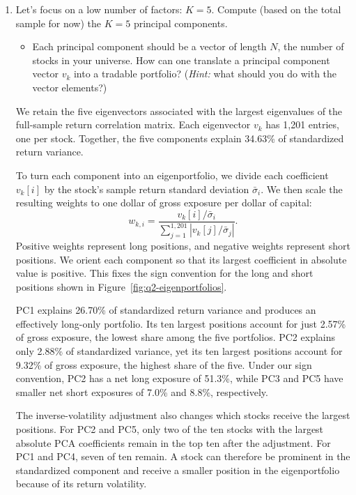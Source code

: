 \documentclass[12pt,letterpaper]{article}
\newcommand{\answer}{\par\medskip}
\begin{document}
\begin{enumerate}
\item Let's focus on a low number of factors: $K=5$. Compute (based on the total
sample for now) the $K=5$ principal components.

\begin{itemize}
\item Each principal component should be a vector of length $N$, the number
of stocks in your universe. How can one translate a principal component vector
$v_k$ into a tradable portfolio? (\emph{Hint:} what should you do with the
vector elements?)
\end{itemize}

\answer
We retain the five eigenvectors associated with the largest eigenvalues
of the full-sample return correlation matrix. Each eigenvector \(v_k\)
has 1,201 entries, one per stock. Together, the five components explain
34.63\% of standardized return variance.

To turn each component into an eigenportfolio, we divide each
coefficient \(v_k[i]\) by the stock's sample return standard deviation
\(\bar{\sigma}_i\). We then scale the resulting weights to one dollar
of gross exposure per dollar of capital:
\[
w_{k,i}
=
\frac{v_k[i]/\bar{\sigma}_i}
     {\displaystyle\sum_{j=1}^{1{,}201}
      \left|v_k[j]/\bar{\sigma}_j\right|}.
\]
Positive weights represent long positions, and negative weights represent
short positions. We orient each component so that its largest coefficient
in absolute value is positive. This fixes the sign convention for the
long and short positions shown in Figure~\ref{fig:q2-eigenportfolios}.

PC1 explains 26.70\% of standardized return variance and produces an
effectively long-only portfolio. Its ten largest positions account for
just 2.57\% of gross exposure, the lowest share among the five portfolios.
PC2 explains only 2.88\% of standardized variance, yet its ten largest
positions account for 9.32\% of gross exposure, the highest share of
the five. Under our sign convention, PC2 has a net long exposure of
51.3\%, while PC3 and PC5 have smaller net short exposures of 7.0\%
and 8.8\%, respectively.

The inverse-volatility adjustment also changes which stocks receive
the largest positions. For PC2 and PC5, only two of the ten stocks with
the largest absolute PCA coefficients remain in the top ten after the
adjustment. For PC1 and PC4, seven of ten remain. A stock can therefore
be prominent in the standardized component and receive a smaller
position in the eigenportfolio because of its return volatility.


\end{enumerate}
\end{document}
